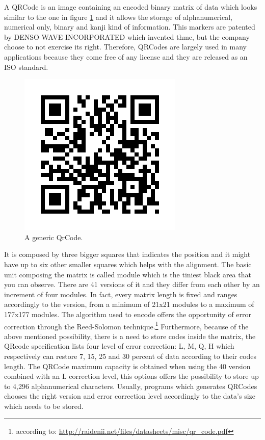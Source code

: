 A QRCode is an image containing an encoded binary matrix of data which looks similar to the one in figure \ref{qr} and it allows the storage of alphanumerical, numerical only, binary and kanji kind of information.
This markers are patented by DENSO WAVE INCORPORATED which invented thme, but the company choose to not exercise its right.
Therefore, QRCodes are largely used in many applications because they come free of any license and they are released as an ISO standard.

\begin{figure}[hbt]
    \centering
    \includegraphics[scale=0.5]{img/qr.png}
    \caption{A generic QrCode. \label{qr}}
\end{figure}

It is composed by three bigger squares that indicates the position and it might have up to six other smaller squares which helps with the alignment. The basic unit composing the matrix is called module which is the tiniest black area that you can observe. There are 41 versions of it and they differ from each other by an increment of four modules. In fact, every matrix length is fixed and ranges accordingly to the version, from a minimum of 21x21 modules to a maximum of 177x177 modules. The algorithm used to encode offers the opportunity of error correction through the Reed-Solomon technique.\footnote{ according to: \url{http://raidenii.net/files/datasheets/misc/qr_code.pdf}}
Furthermore, because of the above mentioned possibility, there is a need to store codes inside the matrix, the QRcode specification lists four level of error correction: L, M, Q, H which respectively can restore 7, 15, 25 and 30 percent of data according to their codes length.\cite{qrerror}
The QRCode maximum capacity is obtained when using the 40 version combined with an L correction level, this options offers the possibility to store up to 4,296 alphanumerical characters\cite{qrversions}.
Usually, programs which generates QRCodes chooses the right version and error correction level accordingly to the data's size which needs to be stored.

